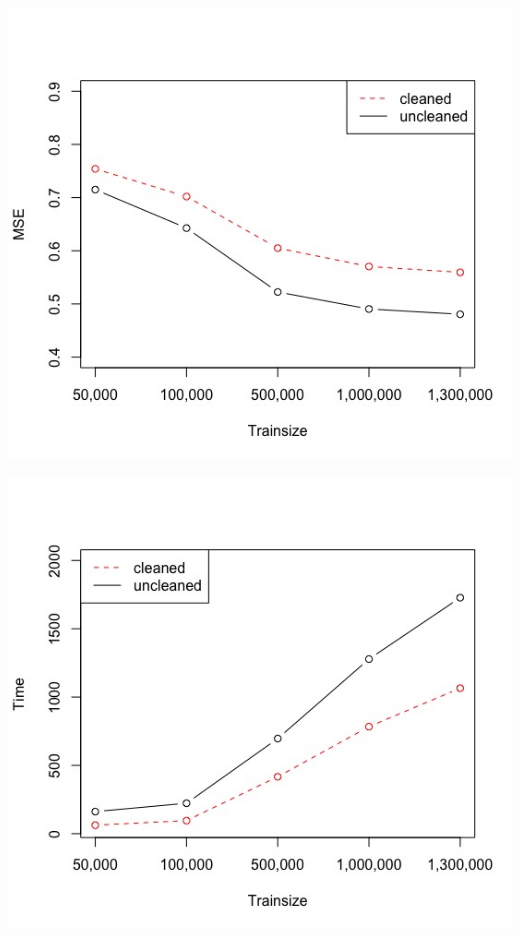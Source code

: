 \documentclass[letterpaper]{article} %
\begin{document}
\begin{center}
\centering
\includegraphics[width=\columnwidth]{../Plots/NBSVM_unclean_clean.jpeg}
\end{center}

\begin{center}
\centering
\includegraphics[width=\columnwidth]{../Plots/NBSVM_runtime_sample.jpeg}
\end{center}



\end{document}
